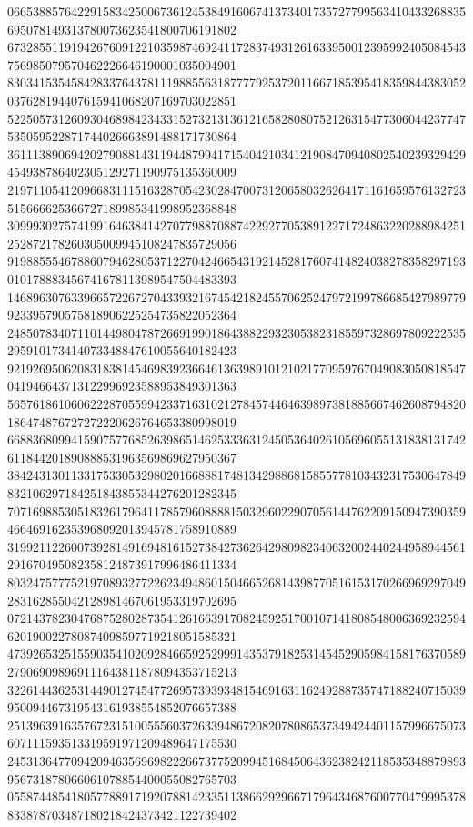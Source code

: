 \begin{DoxyCode}
      066538857642291583425006736124538491606741373401735727799563410433268835695078149313780073623541800706191802
      673285511919426760912210359874692411728374931261633950012395992405084543756985079570462226646190001035004901
      830341535458428337643781119885563187777925372011667185395418359844383052037628194407615941068207169703022851
      522505731260930468984234331527321313612165828080752126315477306044237747535059522871744026663891488171730864
      361113890694202790881431194487994171540421034121908470940802540239329429454938786402305129271190975135360009
      219711054120966831115163287054230284700731206580326264171161659576132723515666625366727189985341998952368848
      309993027574199164638414270779887088742292770538912271724863220288984251252872178260305009945108247835729056
      919885554678860794628053712270424665431921452817607414824038278358297193010178883456741678113989547504483393
      146896307633966572267270433932167454218245570625247972199786685427989779923395790575818906225254735822052364
      248507834071101449804787266919901864388229323053823185597328697809222535295910173414073348847610055640182423
      921926950620831838145469839236646136398910121021770959767049083050818547041946643713122996923588953849301363
      565761861060622287055994233716310212784574464639897381885667462608794820186474876727272220626764653380998019
      668836809941590757768526398651462533363124505364026105696055131838131742611844201890888531963569869627950367
      384243130113317533053298020166888174813429886815855778103432317530647849832106297184251843855344276201282345
      707169885305183261796411785796088881503296022907056144762209150947390359466469162353968092013945781758910889
      319921122600739281491694816152738427362642980982340632002440244958944561291670495082358124873917996486411334
      803247577752197089327722623494860150466526814398770516153170266969297049283162855042128981467061953319702695
      072143782304768752802873541261663917082459251700107141808548006369232594620190022780874098597719218051585321
      473926532515590354102092846659252999143537918253145452905984158176370589279069098969111643811878094353715213
      322614436253144901274547726957393934815469163116249288735747188240715039950094467319543161938554852076657388
      251396391635767231510055560372633948672082078086537349424401157996675073607111593513319591971209489647175530
      245313647709420946356969822266737752099451684506436238242118535348879893956731878066061078854400055082765703
      055874485418057788917192078814233511386629296671796434687600770479995378833878703487180218424373421122739402

\end{DoxyCode}
